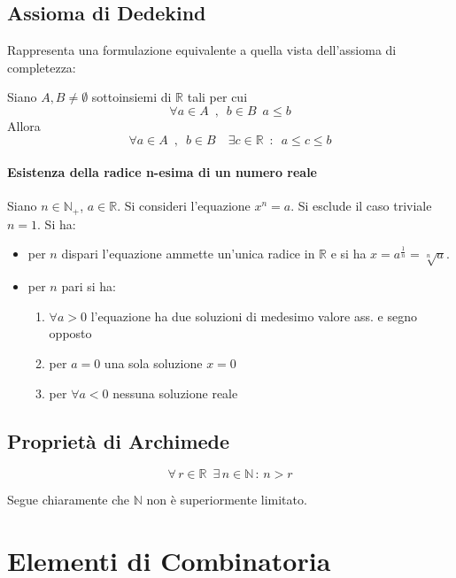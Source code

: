 \documentclass[10pt, oneside]{book}
\theoremstyle{plain}
\begin{document}
\section{Assioma di Dedekind}
Rappresenta una formulazione equivalente a quella vista dell'assioma di completezza:
\begin{ass}
    Siano $A, B \neq \emptyset$ sottoinsiemi di $\mathbb{R}$ tali per cui 
    \[\forall a \in A \enspace, \enspace b \in B \enspace a \leq b\]
    Allora
    \[\forall a \in A\enspace, \enspace b \in B \quad \exists c \in \mathbb{R} \enspace : \enspace a \leq c \leq b\]
\end{ass}

\subsubsection{Esistenza della radice n-esima di un numero reale}
    Siano $n \in \mathbb{N}_+$, $a \in \mathbb{R}$. Si consideri l'equazione $x^n = a$. Si esclude il caso triviale $n = 1$. Si ha:
    \begin{itemize}
        \item per $n$ dispari l'equazione ammette un'unica radice in $\mathbb{R}$ e si ha $x = a^{\frac{1}{n}} = \sqrt[n]{a}$.
        \item per $n$ pari si ha:
        \begin{enumerate}
            \item $\forall a > 0$ l'equazione ha due soluzioni di medesimo valore ass. e segno opposto
            \item per $a = 0$ una sola soluzione $x = 0$
            \item per $\forall a < 0$ nessuna soluzione reale
        \end{enumerate}
    \end{itemize}

\section{Proprietà di Archimede}
\begin{prop}
\[\forall \, r \in \mathbb{R} \enspace \exists \, n \in \mathbb{N} \, : \, n > r\]
\end{prop}
Segue chiaramente che $\mathbb{N}$ non è superiormente limitato.

\chapter{Elementi di Combinatoria}
\end{document}
